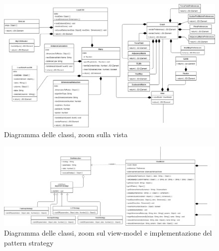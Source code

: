 \begin{landscape}
\vspace*{\fill}
\begin{figure}[hb]
\includegraphics[width=21cm]{Images/Allegato Tecnico-View}
\centering
\caption{Diagramma delle classi, zoom sulla vista}
\end{figure}
\vfill
\end{landscape}

\begin{landscape}
\vspace*{\fill}
\begin{figure}[hb]
\includegraphics[width=\linewidth ]{Images/Allegato Tecnico-ViewModel}
\centering
\caption{Diagramma delle classi, zoom sul view-model e implementazione del pattern strategy}
\end{figure}
\vfill
\end{landscape}
\newpage
